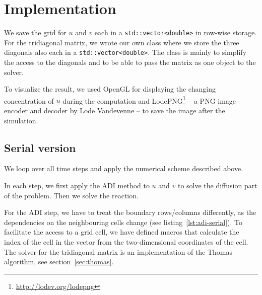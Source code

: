 \documentclass[a4paper]{article}
\begin{document}
\section{Implementation}

We save the grid for $u$ and $v$ each in a \verb+std::vector<double>+ in row-wise storage.
For the tridiagonal matrix, we wrote our own class where we store the three diagonals also each in a \verb+std::vector<double>+.
The class is mainly to simplify the access to the diagonals and to be able to pass the matrix as one object to the solver.

To visualize the result, we used OpenGL for displaying the changing concentration of $u$ during the computation and LodePNG\footnote{\url{http://lodev.org/lodepng}} -- a PNG image encoder and decoder by Lode Vandevenne -- to save the image after the simulation.

\subsection{Serial version}

We loop over all time steps and apply the numerical scheme described above.



In each step, we first apply the ADI method to $u$ and $v$ to solve the diffusion part of the problem.
Then we solve the reaction.

For the ADI step, we have to treat the boundary rows/columns differently, as the dependencies on the neighbouring cells change (see listing~\ref{lst:adi-serial}).
To facilitate the access to a grid cell, we have defined macros that calculate the index of the cell in the vector from the two-dimensional coordinates of the cell.
The solver for the tridiagonal matrix is an implementation of the Thomas algorithm, see section~\ref{sec:thomas}.
\end{document}
